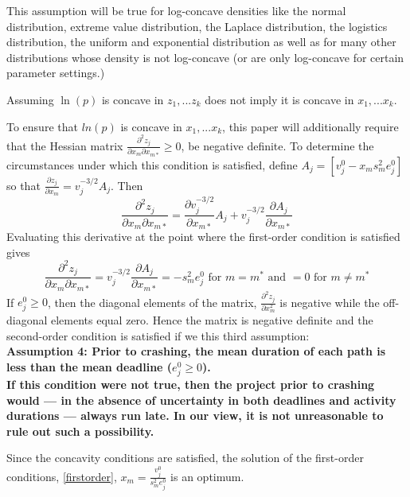 \documentclass[11pt]{article}
\begin{document}
 This assumption will be true for log-concave densities like the normal distribution, extreme value distribution, the Laplace distribution, the logistics distribution, the uniform and exponential distribution as well as for many other distributions whose density is not log-concave (or are only log-concave for certain parameter settings.) \par
Assuming $\ln(p)$ is concave in $z_1,...z_k$ does not imply it is concave in $x_1,...x_k$. \par  To ensure that $ln(p)$ is concave in $x_1,...x_k$, this paper will additionally require that the Hessian matrix $\frac{\partial^2 z_j}{\partial x_m \partial x_{m*}} \geq 0$, be negative definite.   To determine the circumstances under which this condition is satisfied, define 
$A_j=[v^0_j - x_m s^2_m e^0_j] $ so that $\frac{\partial z_j}{\partial x_m} = v_j^{-3/2} A_j $.  Then
$$\frac{\partial^2 z_j}{\partial x_m \partial x_{m*}} =  \frac{\partial v_j^{-3/2}}{\partial x_{m*}} A_j +
 v_j^{-3/2} \frac{\partial A_j}{\partial x_{m*}}  $$
Evaluating this derivative at the point where the first-order condition is satisfied gives
$$
\frac{\partial^2 z_j}{\partial x_m \partial x_{m*}} = v_j^{-3/2}\frac{\partial A_j}{\partial x_{m*}} 
=  - s^2_m e^0_j \mbox{ for } m=m^* \mbox{ and } = 0  \mbox{ for } m \neq m^* $$
      If $e^0_j \geq 0$,  then the diagonal elements of the matrix, $\frac{\partial^2 z_j}{\partial x^2_m} $ is negative while the off-diagonal elements equal zero.  Hence the matrix is negative definite and the second-order condition is satisfied if we this third assumption: \\
      \bf Assumption 4: \rm  Prior to crashing, the mean duration of each path is less than the mean deadline ($e^0_j \geq 0$).   \\
If this condition were not true, then the project prior to crashing would --- in the absence of uncertainty in both deadlines and activity durations --- always run late.  In our view, it is not unreasonable to rule out such a possibility.    
\par
Since the concavity conditions are satisfied, the solution of the first-order conditions,
\ref{firstorder}, $x_m=\frac{v^0_j}{s^2_m e^0_j}$ is an optimum.
\end{document}
